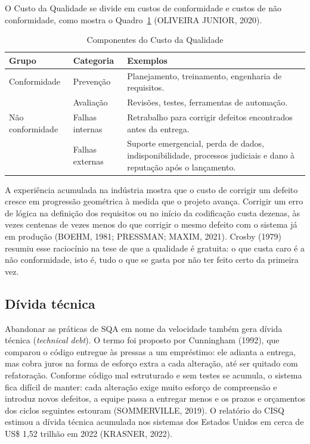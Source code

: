 \documentclass[12pt,a4paper]{article}
\newcommand{\fonte}[1]{\vspace{0.2cm}{\small Fonte: #1}}
\begin{document}
O Custo da Qualidade se divide em custos de conformidade e custos de não conformidade, como mostra o Quadro~\ref{quadro:coq} (OLIVEIRA JUNIOR, 2020).

\begin{table}[htbp]
\centering
\caption{Componentes do Custo da Qualidade}
\label{quadro:coq}
\begin{tabularx}{\textwidth}{>{\raggedright\arraybackslash}p{3.4cm} >{\raggedright\arraybackslash}p{2.6cm} X}
\toprule
\textbf{Grupo} & \textbf{Categoria} & \textbf{Exemplos} \\
\midrule
Conformidade & Prevenção & Planejamento, treinamento, engenharia de requisitos. \\
 & Avaliação & Revisões, testes, ferramentas de automação. \\
\addlinespace
Não conformidade & Falhas internas & Retrabalho para corrigir defeitos encontrados antes da entrega. \\
 & Falhas externas & Suporte emergencial, perda de dados, indisponibilidade, processos judiciais e dano à reputação após o lançamento. \\
\bottomrule
\end{tabularx}

\fonte{elaborado pelo autor com base em Oliveira Junior (2020).}
\end{table}

A experiência acumulada na indústria mostra que o custo de corrigir um defeito cresce em progressão geométrica à medida que o projeto avança. Corrigir um erro de lógica na definição dos requisitos ou no início da codificação custa dezenas, às vezes centenas de vezes menos do que corrigir o mesmo defeito com o sistema já em produção (BOEHM, 1981; PRESSMAN; MAXIM, 2021). Crosby (1979) resumiu esse raciocínio na tese de que a qualidade é gratuita: o que custa caro é a não conformidade, isto é, tudo o que se gasta por não ter feito certo da primeira vez.

\subsection{Dívida técnica}

Abandonar as práticas de SQA em nome da velocidade também gera dívida técnica (\textit{technical debt}). O termo foi proposto por Cunningham (1992), que comparou o código entregue às pressas a um empréstimo: ele adianta a entrega, mas cobra juros na forma de esforço extra a cada alteração, até ser quitado com refatoração. Conforme código mal estruturado e sem testes se acumula, o sistema fica difícil de manter: cada alteração exige muito esforço de compreensão e introduz novos defeitos, a equipe passa a entregar menos e os prazos e orçamentos dos ciclos seguintes estouram (SOMMERVILLE, 2019). O relatório do CISQ estimou a dívida técnica acumulada nos sistemas dos Estados Unidos em cerca de US\$ 1,52 trilhão em 2022 (KRASNER, 2022).
\end{document}
